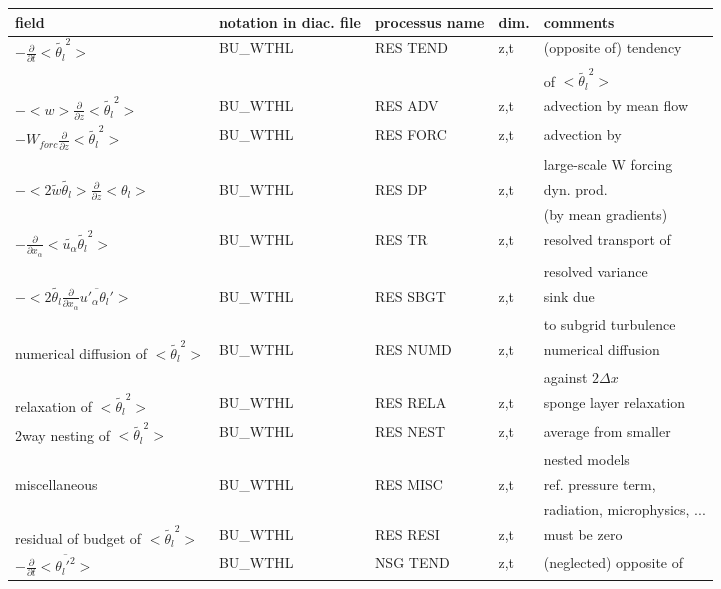 \begin{center}
\begin{tabular}{||p{5cm}|>{\centering}p{2cm}|>{\centering}p{2.5cm}|>{\centering}p{0.5cm}|p{5.5cm }||}
\hline
\hline
field & notation in diac. file & processus name& dim.  & comments \\
\hline
\hline
$-\frac{\partial }{\partial t}<\tilde{\theta_l}^2>$ & BU\_WTHL & RES TEND & z,t & (opposite of) tendency\\
 & & & &of $<\tilde{\theta_l}^2>$\\
\hline
$-<w>\frac{\partial}{\partial z}<\tilde{\theta_l}^2>$ & BU\_WTHL & RES ADV  & z,t & advection by mean flow \\
\hline
$-W_{forc}\frac{\partial}{\partial z}<\tilde{\theta_l}^2>$ & BU\_WTHL & RES FORC & z,t & advection by \\
 & & & & large-scale W forcing \\
\hline
$-< 2 \tilde{w}\tilde{\theta_l}>\frac{\partial }{\partial z}<\theta_l>$ & BU\_WTHL & RES DP   & z,t & dyn. prod.\\
 & & & &(by mean gradients) \\
\hline
$-\frac{\partial}{\partial x_\alpha} <\tilde{u_\alpha} \tilde{\theta_l}^2>$ & BU\_WTHL & RES TR   & z,t & resolved transport of\\
 & & & &resolved variance \\
\hline
$- <2 \tilde{\theta_l}\frac{\partial}{\partial x_\alpha}\overline{u'_\alpha \theta_l'}>$
& BU\_WTHL & RES SBGT & z,t & sink due \\
 & & & &to subgrid turbulence \\
\hline
{\rm numerical diffusion of } $<\tilde{\theta_l}^2>$& BU\_WTHL & RES NUMD & z,t & numerical diffusion\\
 & & & &against $2\Delta x$ \\
\hline
{\rm relaxation of }$<\tilde{\theta_l}^2>$ & BU\_WTHL & RES RELA & z,t& sponge layer relaxation \\
\hline
{\rm 2way nesting of }$<\tilde{\theta_l}^2>$ & BU\_WTHL & RES NEST & z,t& average from smaller\\
 & & & &nested models \\
\hline
{\rm miscellaneous} & BU\_WTHL & RES MISC & z,t & ref. pressure term, \\
 & & && radiation, microphysics, ... \\
\hline
{\rm residual of budget of} $<\tilde{\theta_l}^2>$ & BU\_WTHL & RES RESI & z,t & must be zero \\
\hline
$-\frac{\partial }{\partial t}<\overline{\theta_l'^2}>$ & BU\_WTHL & NSG TEND & z,t & (neglected) opposite of\\

\end{tabular}
\end{center}

